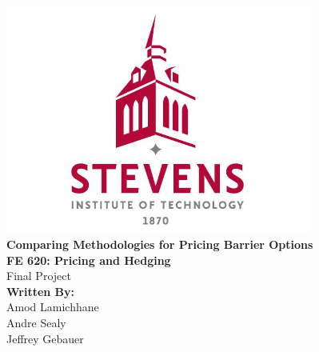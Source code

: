 %

\begin{titlepage}
    \centering
\vspace*{1cm}
{ \includegraphics[width=10cm]{images (2).png}}\\[1cm]

{\LARGE \textbf{Comparing Methodologies for Pricing Barrier Options}}\\[1cm]

\textbf{FE 620: Pricing and Hedging}\\
Final Project\\[0.5cm]

\textbf{Written By:}{}\\
Amod Lamichhane \\[0.5cm]
Andre Sealy \\[0.5cm]
Jeffrey Gebauer \\[0.5cm]
\date{\large Date Last Edited: \today}
\end{titlepage}
